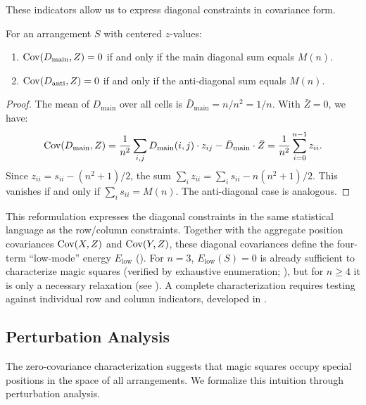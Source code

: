 These indicators allow us to express diagonal constraints in covariance form.

\begin{proposition}
\label{prop:diagonal_cov}
For an arrangement $S$ with centered $z$-values:
\begin{enumerate}
\item $\mathrm{Cov}(D_{\mathrm{main}}, Z) = 0$ if and only if the main diagonal sum equals $M(n)$.
\item $\mathrm{Cov}(D_{\mathrm{anti}}, Z) = 0$ if and only if the anti-diagonal sum equals $M(n)$.
\end{enumerate}
\end{proposition}

\begin{proof}
The mean of $D_{\mathrm{main}}$ over all cells is $\bar{D}_{\mathrm{main}} = n/n^2 = 1/n$.
With $\bar{Z} = 0$, we have:
\[
\mathrm{Cov}(D_{\mathrm{main}}, Z) = \frac{1}{n^2} \sum_{i,j} D_{\mathrm{main}}(i,j) \cdot z_{ij} - \bar{D}_{\mathrm{main}} \cdot \bar{Z}
= \frac{1}{n^2} \sum_{i=0}^{n-1} z_{ii}.
\]
Since $z_{ii} = s_{ii} - (n^2+1)/2$, the sum $\sum_i z_{ii} = \sum_i s_{ii} - n(n^2+1)/2$.
This vanishes if and only if $\sum_i s_{ii} = M(n)$. The anti-diagonal case is analogous.
\end{proof}

This reformulation expresses the diagonal constraints in the same statistical language as the row/column constraints.
Together with the aggregate position covariances $\mathrm{Cov}(X,Z)$ and $\mathrm{Cov}(Y,Z)$, these diagonal covariances define the
four-term ``low-mode'' energy $E_{\mathrm{low}}$ ().
For $n=3$, $E_{\mathrm{low}}(S)=0$ is already sufficient to characterize magic squares
(verified by exhaustive enumeration; ),
but for $n\ge 4$ it is only a necessary relaxation (see ).
A complete characterization requires testing against individual row and column indicators, developed in .

\subsection{Perturbation Analysis}
\label{sec:perturbation}

The zero-covariance characterization suggests that magic squares occupy special positions 
in the space of all arrangements.
We formalize this intuition through perturbation analysis.

